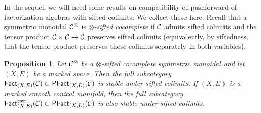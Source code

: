 \documentclass[10pt, reqno, twoside
, final
]{amsart}
\numberwithin{equation}{subsection}%
\theoremstyle{definition}
\theoremstyle{definition}
\theoremstyle{definition}
\theoremstyle{definition}
\theoremstyle{definition}
\theoremstyle{definition}
\theoremstyle{definition}
\theoremstyle{definition}
\theoremstyle{definition}
\theoremstyle{plain}
\theoremstyle{definition}
\theoremstyle{plain}
\theoremstyle{definition}
\theoremstyle{plain}
\theoremstyle{definition}
\theoremstyle{definition}
\theoremstyle{plain}
\theoremstyle{plain}
\theoremstyle{definition}
\theoremstyle{plain}
\theoremstyle{plain}
\newtheorem{prop}[defn]{Proposition}
\theoremstyle{plain}
\begin{document}
In the sequel, we will need some results on compatibility of pushforward of factorization algebras with sifted colimits. We collect these here. Recall that a symmetric monoidal \infcat $\mathcal{C}^{\otimes}$ is \emph{$\otimes$-sifted cocomplete} if $\mathcal{C}$ admits sifted colimits and the tensor product $\mathcal{C}\times\mathcal{C}\rightarrow \mathcal{C}$ preserves sifted colimits (equivalently, by siftedness, that the tensor product preserves those colimits separately in both variables). 
\begin{prop}\label{prop:factorizationsifted}
Let $\mathcal{C}^{\otimes}$ be a $\otimes$-sifted cocomplete symmetric monoidal \infcat and
let $(X,E)$ be a marked space. Then the full subcategory $\mathsf{Fact}_{(X,E)}(\mathcal{C})\subset\mathsf{PFact}_{(X,E)}(\mathcal{C})$ is stable under sifted colimits. If $(X,E)$ is a marked smooth conical manifold, then the full subcategory $\mathsf{Fact}^{\mathrm{cstr}}_{(X,E)}(\mathcal{C})\subset\mathsf{PFact}_{(X,E)}(\mathcal{C})$ is also stable under sifted colimits.
\end{prop}
\end{document}
